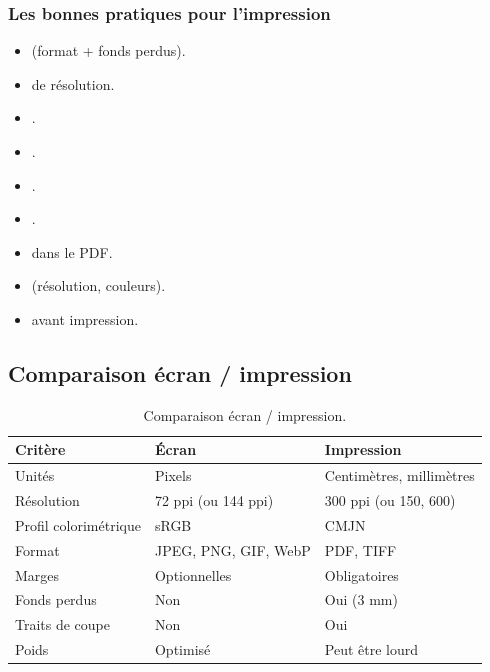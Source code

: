 \subsubsection{Les bonnes pratiques pour l'impression}

\begin{itemize}
    \item {} (format + fonds perdus).
    \item {} de résolution.
    \item {}.
    \item {}.
    \item {}.
    \item {}.
    \item {} dans le PDF.
    \item {} (résolution, couleurs).
    \item {} avant impression.
\end{itemize}

\subsection{Comparaison écran / impression}

\begin{table}[h!]
\centering
\begin{tabular}{@{}p{3.5cm}p{5cm}p{5cm}@{}}
\toprule
\textbf{Critère} & \textbf{Écran} & \textbf{Impression} \\
\midrule
Unités & Pixels & Centimètres, millimètres \\
Résolution & 72 ppi (ou 144 ppi) & 300 ppi (ou 150, 600) \\
Profil colorimétrique & sRGB & CMJN \\
Format & JPEG, PNG, GIF, WebP & PDF, TIFF \\
Marges & Optionnelles & Obligatoires \\
Fonds perdus & Non & Oui (3 mm) \\
Traits de coupe & Non & Oui \\
Poids & Optimisé & Peut être lourd \\
\bottomrule
\end{tabular}
\caption{Comparaison écran / impression.}
\end{table}

